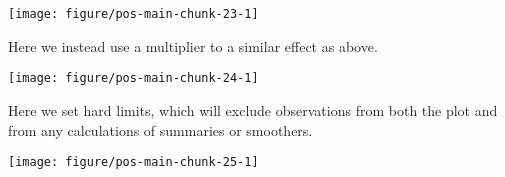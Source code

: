 \documentclass[krantz2]{krantz}\usepackage{knitr}%
\begin{document}
\begin{knitrout}\footnotesize
{}\color{fgcolor}\begin{kframe}
\begin{alltt}
  \hlopt{+} \hlstd{()} \hlopt{+}
  \hlstd{(} \hlstd{=} \hlstd{(} \hlstd{=} \hlstd{(}\hlstd{,} \hlstd{)))}
\end{alltt}
\end{kframe}

{\centering \texttt{[image: figure/pos-main-chunk-23-1]} 

}



\end{knitrout}

Here we instead use a multiplier to a similar effect as above.

\begin{knitrout}\footnotesize
{}\color{fgcolor}\begin{kframe}
\begin{alltt}
  \hlopt{+} \hlstd{()} \hlopt{+}
  \hlstd{(} \hlstd{=} \hlstd{(} \hlstd{=} \hlstd{(}\hlstd{,} \hlstd{)))}
\end{alltt}
\end{kframe}

{\centering \texttt{[image: figure/pos-main-chunk-24-1]} 

}



\end{knitrout}

Here we set hard limits, which will exclude observations from both the plot and from any calculations of summaries or smoothers.

\begin{knitrout}\footnotesize
{}\color{fgcolor}\begin{kframe}
\begin{alltt}
  \hlopt{+} \hlstd{()} \hlopt{+}
  \hlstd{(} \hlstd{=} \hlstd{(}\hlstd{,} \hlstd{))}
\end{alltt}


{\ttfamily\noindent\color{warningcolor}{\#\# Warning: Removed 4 rows containing missing values (geom\_point).}}\end{kframe}

{\centering \texttt{[image: figure/pos-main-chunk-25-1]} 

}



\end{knitrout}
\end{document}
